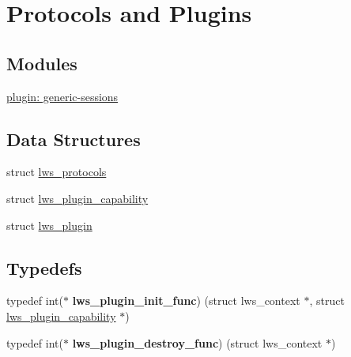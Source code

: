 \hypertarget{group__Protocols-and-Plugins}{}\section{Protocols and Plugins}
\label{group__Protocols-and-Plugins}
\subsection*{Modules}
\begin{DoxyCompactItemize}
\item 
\hyperlink{group__generic-sessions}{plugin\+: generic-\/sessions}
\end{DoxyCompactItemize}
\subsection*{Data Structures}
\begin{DoxyCompactItemize}
\item 
struct \hyperlink{structlws__protocols}{lws\+\_\+protocols}
\item 
struct \hyperlink{structlws__plugin__capability}{lws\+\_\+plugin\+\_\+capability}
\item 
struct \hyperlink{structlws__plugin}{lws\+\_\+plugin}
\end{DoxyCompactItemize}
\subsection*{Typedefs}
\begin{DoxyCompactItemize}
\item 
typedef int($\ast$ {\bfseries lws\+\_\+plugin\+\_\+init\+\_\+func}) (struct lws\+\_\+context $\ast$, struct \hyperlink{structlws__plugin__capability}{lws\+\_\+plugin\+\_\+capability} $\ast$)\hypertarget{group__Protocols-and-Plugins_ga40994491e1567f91f579d2b444775266}{}\label{group__Protocols-and-Plugins_ga40994491e1567f91f579d2b444775266}

\item 
typedef int($\ast$ {\bfseries lws\+\_\+plugin\+\_\+destroy\+\_\+func}) (struct lws\+\_\+context $\ast$)\hypertarget{group__Protocols-and-Plugins_ga83f7a924ba790fa273476075a59f08b0}{}\label{group__Protocols-and-Plugins_ga83f7a924ba790fa273476075a59f08b0}

\end{DoxyCompactItemize}
